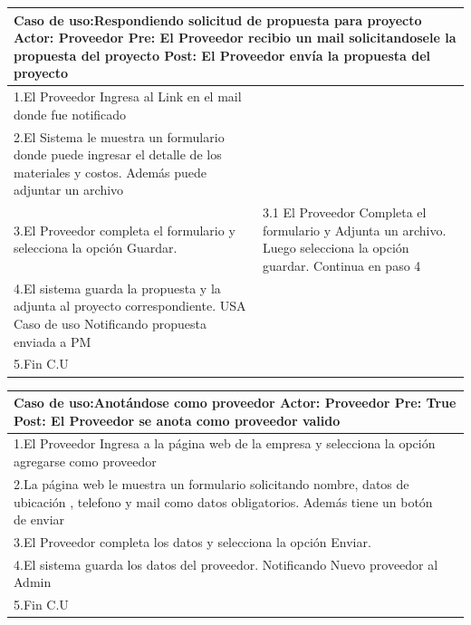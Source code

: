 \begin{longtable}{|p{}|p{}|}
    \hline
    \multicolumn{2}{|p{16cm}|}{
        \textbf{Caso de uso:}Respondiendo solicitud de propuesta para proyecto\newline
        \textbf{Actor:} Proveedor\newline
        \textbf{Pre: }El Proveedor recibio un mail solicitandosele la propuesta del proyecto\newline
        \textbf{Post:}  El Proveedor envía la propuesta del proyecto
    }\\
    \hline
    1.El Proveedor Ingresa al Link en el mail donde fue notificado&    \\
    \hline
    2.El Sistema le muestra un formulario donde puede ingresar el detalle de los materiales y costos. Además puede adjuntar un archivo& \\
    \hline
    3.El Proveedor completa el formulario y selecciona la opción Guardar. &3.1 El Proveedor Completa el formulario y Adjunta un archivo. Luego selecciona la opción guardar. Continua en paso 4\\
    \hline
    4.El sistema guarda la propuesta y la adjunta al proyecto correspondiente. USA Caso de uso Notificando propuesta enviada a PM&\\
    \hline
    5.Fin C.U&\\
    \hline
\end{longtable}

\begin{longtable}{|p{}|p{}|}
    \hline
    \multicolumn{2}{|p{16cm}|}{
        \textbf{Caso de uso:}Anotándose como proveedor\newline
        \textbf{Actor:} Proveedor\newline
        \textbf{Pre: }True\newline
        \textbf{Post:}  El Proveedor se anota como proveedor valido
    }\\
    \hline
    1.El Proveedor Ingresa a la página web de la empresa y selecciona la opción agregarse como proveedor&    \\
    \hline
    2.La página web le muestra un formulario solicitando nombre, datos de ubicación , telefono y mail como datos obligatorios. Además tiene un botón de enviar& \\
    \hline
    3.El Proveedor completa los datos y selecciona la opción Enviar. &\\
    \hline
    4.El sistema guarda los datos del proveedor. Notificando Nuevo proveedor al Admin&\\
    \hline
    5.Fin C.U&\\
    \hline
\end{longtable}


